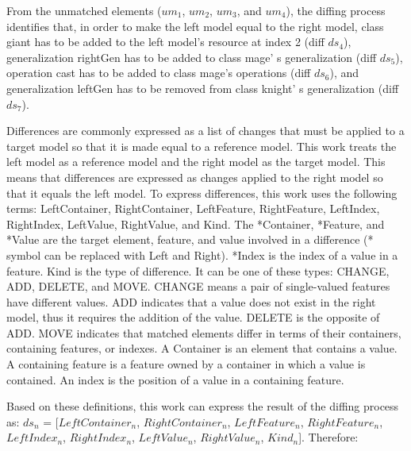From the unmatched elements ($um_1$, $um_2$, $um_3$, and $um_4$), the diffing process identifies that, in order to make the left model equal to the right model, class \textsf{giant} has to be added to the left model's resource at index 2 (diff $ds_4$), generalization \textsf{rightGen} has to be added to class \textsf{mage}' s \textsf{generalization} (diff $ds_5$), operation \textsf{cast} has to be added to class \textsf{mage}'s \textsf{operations} (diff $ds_6$), and  generalization \textsf{leftGen} has to be removed from class \textsf{knight}' s \textsf{generalization} (diff $ds_7$).

Differences are commonly expressed as a list of changes that must be applied to a target model so that it is made equal to a reference model. This work treats the left model as a reference model and the right model as the target model. This means that differences are expressed as changes applied to the right model so that it equals the left model. To express differences, this work uses the following terms: \textsf{LeftContainer}, \textsf{RightContainer}, \textsf{LeftFeature}, \textsf{RightFeature}, \textsf{LeftIndex}, \textsf{RightIndex}, \textsf{LeftValue}, \textsf{RightValue}, and \textsf{Kind}. The \textsf{*Container}, \textsf{*Feature}, and \textsf{*Value} are the target element, feature, and value involved in a difference (\textsf{*} symbol can be replaced with \textsf{Left} and \textsf{Right}). \textsf{*Index} is the index of a value in a feature. \textsf{Kind} is the type of difference. It can be one of these types: \textsf{CHANGE}, \textsf{ADD}, \textsf{DELETE}, and \textsf{MOVE}. \textsf{CHANGE} means a pair of single-valued features have different values. \textsf{ADD} indicates that a value does not exist in the right model, thus it requires the addition of the value. \textsf{DELETE} is the opposite of \textsf{ADD}. \textsf{MOVE} indicates that matched elements differ in terms of their containers, containing features, or indexes. A Container is an element that contains a value. A containing feature is a feature owned by a container in which a value is contained. An index is the position of a value in a containing feature.

Based on these definitions, this work can express the result of the diffing process as: $ds_{n}$ = [$LeftContainer_n$, $RightContainer_n$, $LeftFeature_n$, $RightFeature_n$, $LeftIndex_n$, $RightIndex_n$, $LeftValue_n$, $RightValue_n$, $Kind_n$]. Therefore:

